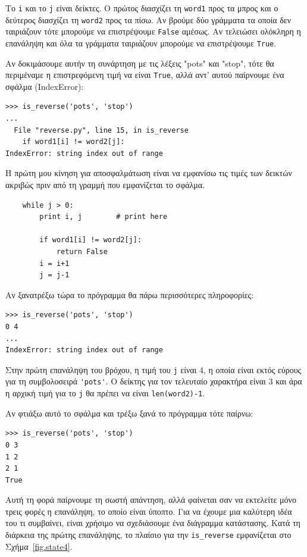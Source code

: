 \documentclass[10pt]{book}
\begin{document}
Το {\tt i} και το {\tt j} είναι δείκτες. Ο πρώτος διασχίζει τη {\tt word1}
προς τα μπρος και ο δεύτερος διασχίζει τη {\tt word2} προς τα πίσω. Αν βρούμε δύο γράμματα τα οποία δεν ταιριάζουν τότε μπορούμε να επιστρέψουμε {\tt False} αμέσως. Αν τελειώσει ολόκληρη η επανάληψη και όλα τα γράμματα ταιριάζουν μπορούμε να επιστρέψουμε {\tt True}.

Αν δοκιμάσουμε αυτήν τη συνάρτηση με τις λέξεις "pots" και "stop", τότε θα 
περιμέναμε η επιστρεφόμενη τιμή να είναι {\tt True}, αλλά αντ' αυτού παίρνουμε ένα σφάλμα (IndexError):

\begin{verbatim}
>>> is_reverse('pots', 'stop')
...
  File "reverse.py", line 15, in is_reverse
    if word1[i] != word2[j]:
IndexError: string index out of range
\end{verbatim}
%

Η πρώτη μου κίνηση για αποσφαλμάτωση είναι να εμφανίσω τις τιμές των δεικτών ακριβώς πριν από τη γραμμή που εμφανίζεται το σφάλμα.

\begin{verbatim}
    while j > 0:
        print i, j        # print here

        if word1[i] != word2[j]:
            return False
        i = i+1
        j = j-1
\end{verbatim}
%

Αν ξανατρέξω τώρα το πρόγραμμα θα πάρω περισσότερες πληροφορίες:

\begin{verbatim}
>>> is_reverse('pots', 'stop')
0 4
...
IndexError: string index out of range
\end{verbatim}
%

Στην πρώτη επανάληψη του βρόχου, η τιμή του {\tt j} είναι 4, η οποία είναι εκτός εύρους για τη συμβολοσειρά \verb"'pots'". Ο δείκτης για τον τελευταίο χαρακτήρα είναι 3 και άρα η αρχική τιμή για το {\tt j} θα πρέπει να είναι {\tt len(word2)-1}.


Αν φτιάξω αυτό το σφάλμα και τρέξω ξανά το πρόγραμμα τότε παίρνω:

\begin{verbatim}
>>> is_reverse('pots', 'stop')
0 3
1 2
2 1
True
\end{verbatim}
%

Αυτή τη φορά παίρνουμε τη σωστή απάντηση, αλλά φαίνεται σαν να εκτελείτε μόνο τρεις φορές η επανάληψη, το οποίο είναι ύποπτο. Για να έχουμε μια καλύτερη ιδέα του τι συμβαίνει, είναι χρήσιμο να σχεδιάσουμε ένα διάγραμμα κατάστασης. Κατά τη διάρκεια της πρώτης επανάληψης, το πλαίσιο για την  \verb"is_reverse" 
εμφανίζεται στο Σχήμα~\ref{fig.state4}. 
\end{document}

